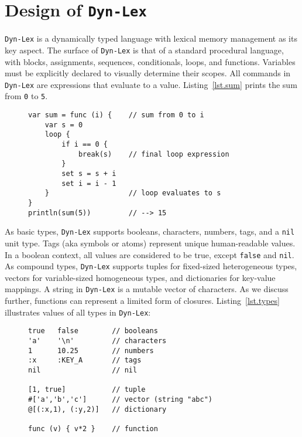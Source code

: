 \documentclass[12pt]{article}
\newcommand{\code}[1] {\texttt{\footnotesize{#1}}}
\newcommand{\lex} {\texttt{Dyn-Lex}\xspace}
\begin{document}
\section{Design of \lex}
\label{sec.design}

\lex is a dynamically typed language with lexical memory management as its key
aspect.
The surface of \lex is that of a standard procedural language, with blocks,
assignments, sequences, conditionals, loops, and functions.
Variables must be explicitly declared to visually determine their scopes.
All commands in \lex are expressions that evaluate to a value.
Listing~\ref{lst.sum} prints the sum from \code{0} to \code{5}.

\begin{figure}
\begin{lstlisting}[caption=Calculates the sum from \code{0} to \code{5} in \lex., label=lst.sum]
var sum = func (i) {    // sum from 0 to i
    var s = 0
    loop {
        if i == 0 {
            break(s)    // final loop expression
        }
        set s = s + i
        set i = i - 1
    }                   // loop evaluates to s
}
println(sum(5))         // --> 15
\end{lstlisting}
\end{figure}

As basic types, \lex supports booleans, characters, numbers, tags, and a
\code{nil} unit type.
Tags (aka symbols or atoms) represent unique human-readable values.
In a boolean context, all values are considered to be true, except \code{false}
and \code{nil}.
As compound types, \lex supports
    tuples for fixed-sized heterogeneous types,
    vectors for variable-sized homogeneous types, and
    dictionaries for key-value mappings.
A string in \lex is a mutable vector of characters.
As we discuss further, functions can represent a limited form of closures.
Listing~\ref{lst.types} illustrates values of all types in \lex:

\begin{figure}
\begin{lstlisting}[caption=Basic and compound types of \lex., label=lst.types]
true   false        // booleans
'a'    '\n'         // characters
1      10.25        // numbers
:x     :KEY_A       // tags
nil                 // nil

[1, true]           // tuple
#['a','b','c']      // vector (string "abc")
@[(:x,1), (:y,2)]   // dictionary

func (v) { v*2 }    // function
\end{lstlisting}
\end{figure}
\end{document}
